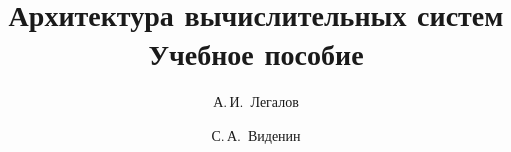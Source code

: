 \documentclass [a4paper, 12pt, oneside]{scrbook}
\begin{document}
\renewcommand\figurename{Рисунок}


\title{\Huge{Архитектура вычислительных систем\\ \large{Учебное пособие}}}

\author {{\Large{А.\,И.~Легалов}}
\and {\Large{С.\,А.~Виденин}}}

\maketitle


\tableofcontents















\end{document}
